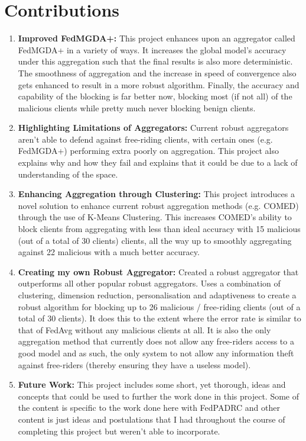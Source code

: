 \section{Contributions}
\begin{enumerate}
    \item \textbf{Improved FedMGDA+:} 
    This project enhances upon an aggregator called FedMGDA+ in a variety of ways.
    It increases the global model's accuracy under this aggregation such that the final results is also more deterministic.
    The smoothness of aggregation and the increase in speed of convergence also gets enhanced to result in a more robust algorithm.
    Finally, the accuracy and capability of the blocking is far better now, blocking most (if not all) of the malicious clients while pretty much never blocking benign clients.
    
    \item \textbf{Highlighting Limitations of Aggregators:}
    Current robust aggregators aren't able to defend against free-riding clients, with certain ones (e.g. FedMGDA+) performing extra poorly on aggregation.
    This project also explains why and how they fail and explains that it could be due to a lack of understanding of the space.
    
    \item \textbf{Enhancing Aggregation through Clustering:}
    This project introduces a novel solution to enhance current robust aggregation methods (e.g. COMED) through the use of K-Means Clustering.
    This increases COMED's ability to block clients from aggregating with less than ideal accuracy with 15 malicious (out of a total of 30 clients) clients, all the way up to smoothly aggregating against 22 malicious with a much better accuracy.
    
    \item \textbf{Creating my own Robust Aggregator:}
    Created a robust aggregator that outperforms all other popular robust aggregators.
    Uses a combination of clustering, dimension reduction, personalisation and adaptiveness to create a robust algorithm for blocking up to 26 malicious / free-riding clients (out of a total of 30 clients).
    It does this to the extent where the error rate is similar to that of FedAvg without any malicious clients at all.
    It is also the only aggregation method that currently does not allow any free-riders access to a good model and as such, the only system to not allow any information theft against free-riders (thereby ensuring they have a useless model).
    
    \item \textbf{Future Work:}
    This project includes some short, yet thorough, ideas and concepts that could be used to further the work done in this project.
    Some of the content is specific to the work done here with FedPADRC and other content is just ideas and postulations that I had throughout the course of completing this project but weren't able to incorporate.
        
\end{enumerate}


